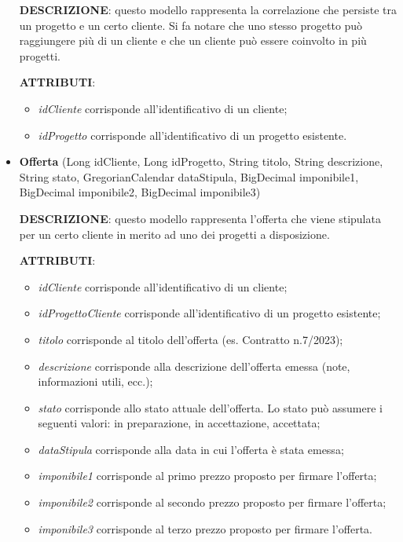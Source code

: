 \begin{itemize}
\setlength{\parskip}{3ex}

\textbf{DESCRIZIONE}: questo modello rappresenta la correlazione che persiste tra un progetto e un certo cliente. Si fa notare che uno stesso progetto può raggiungere più di un cliente e che un cliente può essere coinvolto in più progetti.

\setlength{\parskip}{3ex}

\textbf{ATTRIBUTI}:
\begin{itemize}
\item \textit{idCliente} corrisponde all'identificativo di un cliente;
\item \textit{idProgetto} corrisponde all'identificativo di un progetto esistente.
\end{itemize}

\pagebreak

\item \textbf{Offerta} (Long idCliente, Long idProgetto, String titolo, String descrizione, String stato, GregorianCalendar dataStipula, BigDecimal imponibile1, BigDecimal imponibile2, BigDecimal imponibile3)

\setlength{\parskip}{3ex}

\textbf{DESCRIZIONE}: questo modello rappresenta l'offerta che viene stipulata per un certo cliente in merito ad uno dei progetti a disposizione.

\setlength{\parskip}{3ex}

\textbf{ATTRIBUTI}:
\begin{itemize}
\item \textit{idCliente} corrisponde all'identificativo di un cliente;
\item \textit{idProgettoCliente} corrisponde all'identificativo di un progetto esistente;
\item \textit{titolo} corrisponde al titolo dell'offerta (es. Contratto n.7/2023);
\item \textit{descrizione} corrisponde alla descrizione dell'offerta emessa (note, informazioni utili, ecc.);
\item \textit{stato} corrisponde allo stato attuale dell'offerta. Lo stato può assumere i seguenti valori: in preparazione, in accettazione, accettata;
\item \textit{dataStipula} corrisponde alla data in cui l'offerta è stata emessa;
\item \textit{imponibile1} corrisponde al primo prezzo proposto per firmare l'offerta;
\item \textit{imponibile2} corrisponde al secondo prezzo proposto per firmare l'offerta;
\item \textit{imponibile3} corrisponde al terzo prezzo proposto per firmare l'offerta.
\end{itemize}
\end{itemize}

